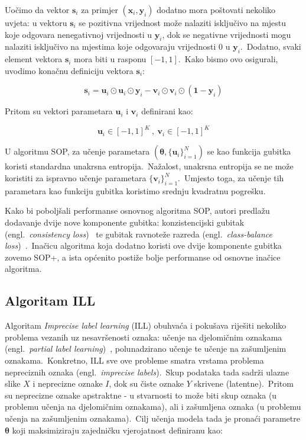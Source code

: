 \documentclass[diplomskirad]{fer}
\begin{document}
Uočimo da vektor $\bm{s}_i$ za primjer $(\bm{x}_i, \bm{y}_i)$ dodatno mora poštovati nekoliko uvjeta: u vektoru $\bm{s}_i$ se pozitivna vrijednost može nalaziti isključivo na mjestu koje odgovara nenegativnoj vrijednosti u $\bm{y}_i$, dok se negativne vrijednosti mogu nalaziti isključivo na mjestima koje odgovaraju vrijednosti $0$ u $\bm{y}_i$.\ 
Dodatno, svaki element vektora $\bm{s}_i$ mora biti u rasponu $\left[ -1, 1 \right]$.\ Kako bismo ovo osigurali, uvodimo konačnu definiciju vektora $\bm{s}_i$:

\begin{equation}
  \bm{s}_i = \bm{u}_i \odot \bm{u}_i \odot \bm{y}_i - \bm{v}_i \odot \bm{v}_i \odot (\bm{1} - \bm{y}_i)
  \label{eq:sop_s2}
\end{equation}

Pritom su vektori parametara $\bm{u}_i$ i $\bm{v}_i$ definirani kao:

\begin{equation}
  \bm{u}_i \in \left[ -1, 1 \right]^K\:,\:\bm{v}_i \in \left[ -1, 1 \right]^K
  \label{eq:sop_u,i}
\end{equation}

U algoritmu SOP, za učenje parametara $(\bm{\theta}, \{\bm{u}_i\}_{i=1}^N)$ se kao funkcija gubitka koristi standardna unakrsna entropija.\ Nažalost, unakrsna entropija se ne može koristiti za ispravno učenje parametara $\{\bm{v}_i\}_{i=1}^N$.\ 
Umjesto toga, za učenje tih parametara kao funkciju gubitka koristimo srednju kvadratnu pogrešku.\ 

Kako bi poboljšali performanse osnovnog algoritma SOP, autori predlažu dodavanje dvije nove komponente gubitka: konzistencijski gubitak (engl.\ \textit{consistency loss})~\cite{berthelot2019mixmatch} te gubitak ravnoteže razreda (engl.\ \textit{class-balance loss})~\cite{tanaka2018joint}.\ 
Inačicu algoritma koja dodatno koristi ove dvije komponente gubitka zovemo SOP+, a ista općenito postiže bolje performanse od osnovne inačice algoritma.\

\pagebreak

\subsection{Algoritam ILL}
\label{sub:ill}

Algoritam \textit{Imprecise label learning} (ILL) obuhvaća i pokušava riješiti nekoliko problema vezanih uz nesavršenosti oznaka: učenje na djelomičnim oznakama (engl.\ \textit{partial label learning})~\cite{tian2023partial}, polunadzirano učenje te učenje na zašumljenim oznakama.\ 
Konkretno, ILL sve ove probleme smatra vrstama problema nepreciznih oznaka (engl.\ \textit{imprecise labels}).\ Skup podataka tada sadrži ulazne slike $X$ i neprecizne oznake $I$, dok su čiste oznake $Y$ skrivene (latentne).\ 
Pritom su neprecizne oznake apstraktne - u stvarnosti to može biti skup oznaka (u problemu učenja na djelomičnim oznakama), ali i zašumljena oznaka (u problemu učenja na zašumljenim oznakama).\ 
Cilj učenja modela tada je pronaći parametre $\bm{\theta}$ koji maksimiziraju zajedničku vjerojatnost definiranu kao: 
\end{document}
